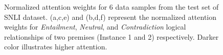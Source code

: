 \documentclass[11pt,a4paper]{article}
\begin{document}
\begin{figure}[ht]
\begin{center}
		\end{center}
		\caption{
			Normalized attention weights for 6 data samples from the test set of SNLI dataset. (a,c,e) and (b,d,f) represent the normalized attention weights for \emph{Entailment}, \emph{Neutral}, and \emph{Contradiction} logical relationships of two premises (Instance 1 and 2) respectively. Darker color illustrates higher attention. 
		}
		\label{fig:att:sample:1}
	\end{figure}
	
\end{document}
